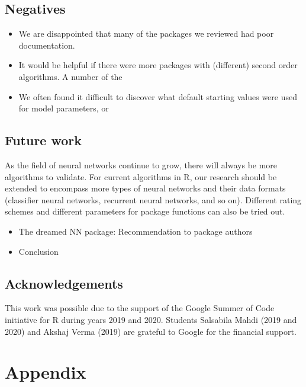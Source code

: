 \hypertarget{negatives}{%
\subsection{Negatives}\label{negatives}}

\begin{itemize}
\tightlist
\item
  We are disappointed that many of the packages we reviewed had poor
  documentation.
\item
  It would be helpful if there were more packages with (different)
  second order algorithms. A number of the 
\item
  We often found it difficult to discover what default starting values
  were used for model parameters, or 
\end{itemize}

\hypertarget{future-work}{%
\subsection{Future work}\label{future-work}}

As the field of neural networks continue to grow, there will always be
more algorithms to validate. For current algorithms in R, our research
should be extended to encompass more types of neural networks and their
data formats (classifier neural networks, recurrent neural networks, and
so on). Different rating schemes and different parameters for package
functions can also be tried out.

\begin{itemize}
\tightlist
\item
  The dreamed NN package: Recommendation to package authors
\item
  Conclusion
\end{itemize}

\hypertarget{acknowledgements}{%
\subsection{Acknowledgements}\label{acknowledgements}}

This work was possible due to the support of the Google Summer of Code
initiative for R during years 2019 and 2020. Students Salsabila Mahdi
(2019 and 2020) and Akshaj Verma (2019) are grateful to Google for the
financial support.



\hypertarget{appendix}{%
\section{Appendix}\label{appendix}}

